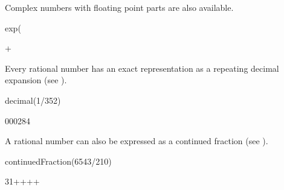 {{{{{{{{\begin{xtc}
\end{xtc}
\begin{xtc}
\begin{xtccomment}
Complex numbers with floating point parts are also available.
\end{xtccomment}
\begin{spadsrc}
exp(%
\end{spadsrc}
\begin{TeXOutput}
\begin{fricasmath}{17}
+\TIMES \ImaginaryI %
\end{fricasmath}
\end{TeXOutput}
\end{xtc}
\begin{xtc}
\begin{xtccomment}
Every rational number has an exact representation as a
repeating decimal expansion
(see ).
\end{xtccomment}
\begin{spadsrc}
decimal(1/352)
\end{spadsrc}
\begin{TeXOutput}
\begin{fricasmath}{18}
000284%
\end{fricasmath}
\end{TeXOutput}
\end{xtc}
\begin{xtc}
\begin{xtccomment}
A rational number can also be expressed as a continued fraction (see
).
\end{xtccomment}
\begin{spadsrc}
continuedFraction(6543/210)
\end{spadsrc}
\begin{TeXOutput}
\begin{fricasmath}{19}
31++++%
\end{fricasmath}

\end{TeXOutput}
\end{xtc}}}}}}}}}
